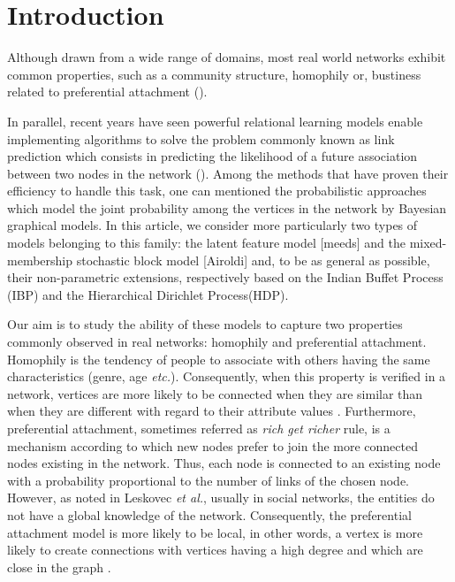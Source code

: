 \section{Introduction}
\label{sec:introduction}
Although drawn from a wide range of domains, most real world networks exhibit common properties, such as a community structure, homophily or,  bustiness related to  preferential attachment (\cite{Newman2010, Barabasi2003}).

In parallel, recent years have seen powerful relational learning models enable implementing algorithms to solve the  problem commonly known as link prediction which consists in predicting the likelihood of a future association between two nodes in the network (\cite{Liben-Nowell07, HassanZaki11}). Among the methods that have proven their efficiency to handle this task, one can mentioned the probabilistic approaches which model the joint probability among the vertices in the network by Bayesian graphical models. In this article, we consider more particularly two types of models belonging to this family: the latent feature model [meeds] and the mixed-membership stochastic block model [Airoldi] and, to be as general as possible, their non-parametric extensions, respectively based on the Indian Buffet Process (IBP) and the Hierarchical Dirichlet Process(HDP).
 
Our aim is to study the ability of these models to capture two properties commonly observed in real networks: homophily and preferential attachment.
Homophily is the tendency of people to associate with others having the same characteristics (genre, age \textit{etc.}).  Consequently, when this property is verified in a network,  vertices are more likely to be connected when they are similar than when they are different  with regard to their attribute values \cite{mcpherson2001birds}.  %
Furthermore,  preferential attachment, sometimes referred as \textit{rich get richer } rule,  is a mechanism  according to which new nodes prefer to join the more connected nodes existing in the network. Thus, each node is connected to an existing node with a probability proportional to
the number of links of the chosen node. However, as noted in Leskovec \textit{et al.}, usually in social networks, the entities do not have a global knowledge of the network. Consequently, the preferential attachment model is more likely to be local, in other words,  a vertex is more likely to create connections with vertices having a high degree and which are close in the graph \cite{LeskovecBKT08}.


